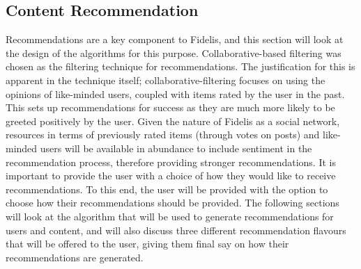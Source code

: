\subsection{Content Recommendation}
\label{sec:ContentRecommendation}
Recommendations are a key component to Fidelis, and this section will look at the design of the algorithms for this purpose. Collaborative-based filtering was chosen as the filtering technique for recommendations. The justification for this is apparent in the technique itself; collaborative-filtering focuses on using the opinions of like-minded users, coupled with items rated by the user in the past. This sets up recommendations for success as they are much more likely to be greeted positively by the user. Given the nature of Fidelis as a social network, resources in terms of previously rated items (through votes on posts) and like-minded users will be available in abundance to include sentiment in the recommendation process, therefore providing stronger recommendations. It is important to provide the user with a choice of how they would like to receive recommendations. To this end, the user will be provided with the option to choose how their recommendations should be provided. The following sections will look at the algorithm that will be used to generate recommendations for users and content, and will also discuss three different recommendation flavours that will be offered to the user, giving them final say on how their recommendations are generated. 

